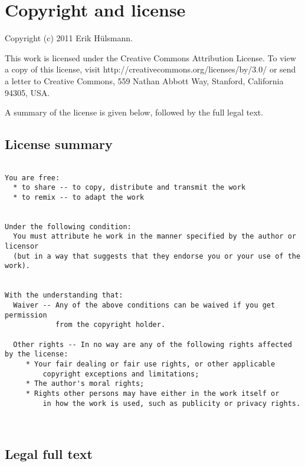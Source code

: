 \chapter{Copyright and license}

Copyright (c) 2011 Erik H\"ulsmann.


This work is licensed under the Creative Commons Attribution License.
To view a copy of this license, visit http://creativecommons.org/licenses/by/3.0/
or send a letter to Creative Commons, 559 Nathan Abbott Way,
Stanford, California 94305, USA.

A summary of the license is given below, followed by the full legal text.

\section{License summary}

\begin{verbatim}

You are free:
  * to share -- to copy, distribute and transmit the work
  * to remix -- to adapt the work


Under the following condition:
  You must attribute he work in the manner specified by the author or licensor
  (but in a way that suggests that they endorse you or your use of the work).


With the understanding that:
  Waiver -- Any of the above conditions can be waived if you get permission
            from the copyright holder.
  
  Other rights -- In no way are any of the following rights affected by the license:
     * Your fair dealing or fair use rights, or other applicable 
         copyright exceptions and limitations;
     * The author's moral rights;
     * Rights other persons may have either in the work itself or
         in how the work is used, such as publicity or privacy rights.



\end{verbatim}



\section{Legal full text}

